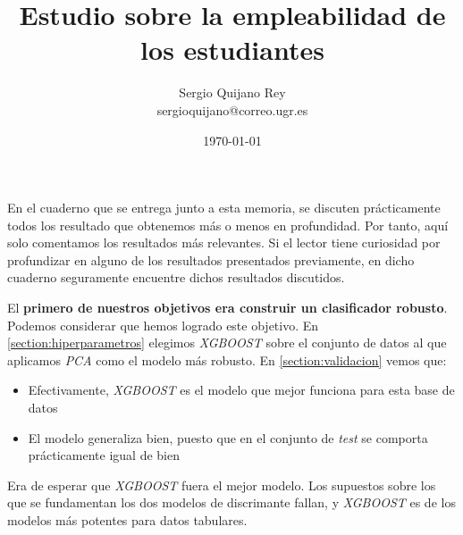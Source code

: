 \documentclass[11pt]{article}
\title{
    Estudio sobre la empleabilidad de los estudiantes
}
\author{
    {Sergio Quijano Rey}\\
    {sergioquijano@correo.ugr.es}
}
\date{\today}
\begin{document}
\maketitle
\pagebreak

\tableofcontents


\listoffigures

\listoftables

{}

\pagebreak



\newpage


\newpage


\newpage


\newpage



En el cuaderno que se entrega junto a esta memoria, se discuten prácticamente todos los resultado que obtenemos más o menos en profundidad. Por tanto, aquí solo comentamos los resultados más relevantes. Si el lector tiene curiosidad por profundizar en alguno de los resultados presentados previamente, en dicho cuaderno seguramente encuentre dichos resultados discutidos.

El \textbf{primero de nuestros objetivos era construir un clasificador robusto}. Podemos considerar que hemos logrado este objetivo. En \ref{section:hiperparametros} elegimos \textit{XGBOOST} sobre el conjunto de datos al que aplicamos \textit{PCA} como el modelo más robusto. En \ref{section:validacion} vemos que:

\begin{itemize}
    \item Efectivamente, \textit{XGBOOST} es el modelo que mejor funciona para esta base de datos
    \item El modelo generaliza bien, puesto que en el conjunto de \textit{test} se comporta prácticamente igual de bien
\end{itemize}

Era de esperar que \textit{XGBOOST} fuera el mejor modelo. Los supuestos sobre los que se fundamentan los dos modelos de discrimante fallan, y \textit{XGBOOST} es de los modelos más potentes para datos tabulares.
\end{document}
